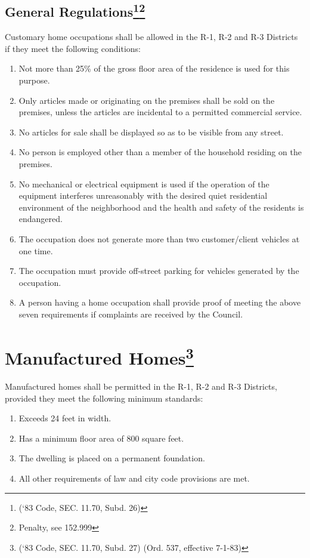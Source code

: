 \subsection{General Regulations\footnote{(‘83 Code, SEC. 11.70, Subd. 26)}\footnote{Penalty, see 152.999}}
Customary home occupations shall be allowed in the R-1, R-2 and R-3 Districts if they meet the following conditions:
\begin{enumerate}[{\indent}1)]
    \item Not more than 25\% of the gross floor area of the residence is used for this purpose.
    \item Only articles made or originating on the premises shall be sold on the premises, unless the articles are incidental to a permitted commercial service.
    \item No articles for sale shall be displayed so as to be visible from any street.
    \item No person is employed other than a member of the household residing on the premises.
    \item No mechanical or electrical equipment is used if the operation of the equipment interferes unreasonably with the desired quiet residential environment of the neighborhood and the health and safety of the residents is endangered.
    \item The occupation does not generate more than two customer/client vehicles at one time.
    \item The occupation must provide off-street parking for vehicles generated by the occupation.
    \item A person having a home occupation shall provide proof of meeting the above seven requirements if complaints are received by the Council.
\end{enumerate}

\section{Manufactured Homes\footnote{(‘83 Code, SEC. 11.70, Subd. 27)  (Ord. 537, effective 7-1-83)}}
Manufactured homes shall be permitted in the R-1, R-2 and R-3 Districts, provided they meet the following minimum standards:
\begin{enumerate}[{\indent}A)]
    \item Exceeds 24 feet in width.
    \item Has a minimum floor area of 800 square feet.
    \item The dwelling is placed on a permanent foundation.
    \item All other requirements of law and city code provisions are met.
\end{enumerate}

